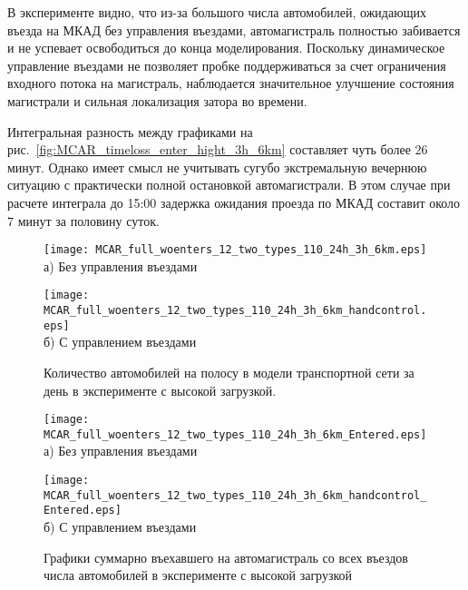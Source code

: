 В эксперименте видно, что из-за большого числа автомобилей, ожидающих въезда на МКАД без управления въездами, автомагистраль полностью забивается и не успевает освободиться до конца моделирования.
Поскольку динамическое управление въездами не позволяет пробке поддерживаться за счет ограничения входного потока на магистраль, наблюдается значительное улучшение состояния магистрали и сильная локализация затора во времени.

Интегральная разность между графиками на рис.~\ref{fig:MCAR_timeloss_enter_hight_3h_6km} составляет чуть более $26$ минут.
Однако имеет смысл не учитывать сугубо экстремальную вечернюю ситуацию с практически полной остановкой автомагистрали. В этом случае при расчете интеграла до 15:00 задержка ожидания проезда по МКАД составит около $7$ минут за половину суток.

\begin{figure}[ht]
    \begin{minipage}[b][][b]{0.49\textwidth}
        \centering
        \texttt{[image: MCAR\_full\_woenters\_12\_two\_types\_110\_24h\_3h\_6km.eps]} \\ а) Без управления въездами
    \end{minipage}
    \hfill
    \begin{minipage}[b][][b]{0.49\textwidth}
        \centering
        \texttt{[image: MCAR\_full\_woenters\_12\_two\_types\_110\_24h\_3h\_6km\_handcontrol.eps]} \\ б) С управлением въездами
    \end{minipage}

    \caption{Количество автомобилей на полосу в модели транспортной сети за день в эксперименте с высокой загрузкой.}
    \label{fig:MCAR_heatmap_hight_3h_6km}
\end{figure}

\begin{figure}[ht]
    \begin{minipage}[b][][b]{.49\textwidth}
        \centering
        \texttt{[image: MCAR\_full\_woenters\_12\_two\_types\_110\_24h\_3h\_6km\_Entered.eps]} \\ а) Без управления въездами
    \end{minipage}
    \hfill
    \begin{minipage}[b][][b]{.49\textwidth}
        \centering
        \texttt{[image: MCAR\_full\_woenters\_12\_two\_types\_110\_24h\_3h\_6km\_handcontrol\_Entered.eps]} \\ б) С управлением въездами
    \end{minipage}

    \caption{Графики суммарно въехавшего на автомагистраль со всех въездов числа автомобилей в эксперименте с высокой загрузкой}
    \label{fig:MCAR_entered_hight_3h_6km}
\end{figure}


